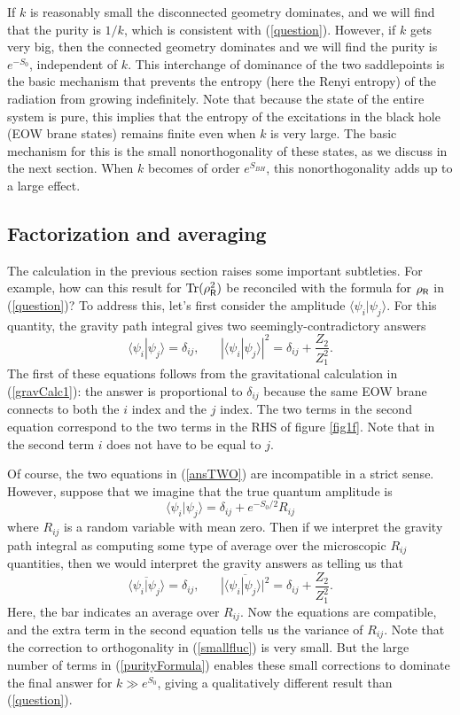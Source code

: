 \documentclass[12pt]{article}
\newcommand{\be}{\begin{equation}}
\newcommand{\ee}{\end{equation}}
\numberwithin{equation}{section}
\def\tr{\text{Tr}}
\begin{document}
If $k$ is reasonably small the disconnected geometry dominates, and we will find that the purity is $1/k$, which is consistent with (\ref{question}). However, if $k$ gets very big, then the connected geometry dominates and we will find the purity is $e^{-S_0}$, independent of $k$.   This interchange of dominance of the two saddlepoints  is the basic mechanism that prevents the entropy (here the Renyi entropy) of the radiation from growing indefinitely. Note that because the state of the entire system is pure, this implies that the entropy of the excitations in the black hole (EOW brane states) remains finite even when $k$ is very large. The basic mechanism for this is the small nonorthogonality of these states, as we discuss in the next section. When $k$ becomes of order $e^{S_{BH}}$, this nonorthogonality adds up to a large effect.


\subsection{Factorization and averaging}\label{sec:factorization and averaging}

The calculation in the previous section raises some important subtleties. For example, how can this result for $\tr(\rho_{\sf{R}}^2)$ be reconciled with the formula for $\rho_{\sf{R}}$ in (\ref{question})? To address this, let's first consider the amplitude $\langle \psi_i|\psi_j\rangle$. For this quantity, the gravity path integral gives two seemingly-contradictory answers
\be
\langle \psi_i|\psi_j\rangle = \delta_{ij},\hspace{20pt} |\langle \psi_{i}|\psi_j\rangle|^2 = \delta_{ij}+ \frac{Z_2}{Z_1^2}.\label{ansTWO}
\ee
The first of these equations follows from the gravitational calculation in (\ref{gravCalc1}): the answer is proportional to $\delta_{ij}$ because the same EOW brane connects to both the $i$ index and the $j$ index. The two terms in the second equation correspond to the two terms in the RHS of figure \ref{fig1f}. Note that in the second term $i$ does not have to be equal to $j$.

Of course, the two equations in (\ref{ansTWO}) are incompatible in a strict sense. However, suppose that we imagine that the true quantum amplitude is
\be\label{smallfluc}
\langle \psi_{i}|\psi_j\rangle = \delta_{ij} + e^{-S_0/2}R_{ij}
\ee
where $R_{ij}$ is a random variable with mean zero. Then if we interpret the gravity path integral as computing some type of average over the microscopic $R_{ij}$ quantities, then we would interpret the gravity answers as telling us that
\be
\overline{\langle \psi_i|\psi_j\rangle} = \delta_{ij}, \hspace{20pt} \overline{|\langle \psi_{i}|\psi_j\rangle|^2} = \delta_{ij}+ \frac{Z_2}{Z_1^2}.\label{amplitudes}
\ee
Here, the bar indicates an average over $R_{ij}$. Now the equations are compatible, and the extra term in the second equation tells us the variance of $R_{ij}$. Note that the correction to orthogonality in (\ref{smallfluc}) is very small.  But the large number of terms in  (\ref{purityFormula}) enables these small corrections to dominate the final answer for $k \gg e^{S_0}$, giving a qualitatively different result than (\ref{question}).
\end{document}
